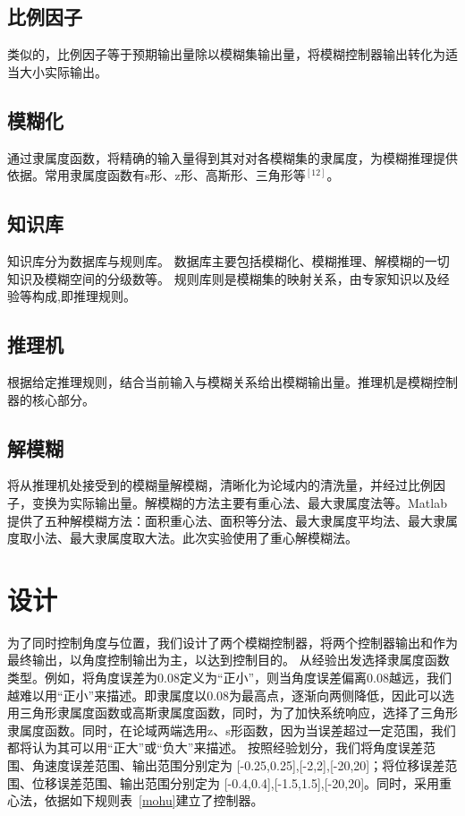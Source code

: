 \subsection{比例因子}
类似的，比例因子等于预期输出量除以模糊集输出量，将模糊控制器输出转化为适当大小实际输出。
\subsection{模糊化}
通过隶属度函数，将精确的输入量得到其对对各模糊集的隶属度，为模糊推理提供依据。常用隶属度函数有s形、z形、高斯形、三角形等$^{[12]}$。
\subsection{知识库}
知识库分为数据库与规则库。
数据库主要包括模糊化、模糊推理、解模糊的一切知识及模糊空间的分级数等。 
规则库则是模糊集的映射关系，由专家知识以及经验等构成,即推理规则。
\subsection{推理机}
根据给定推理规则，结合当前输入与模糊关系给出模糊输出量。推理机是模糊控制器的核心部分。
\subsection{解模糊}
将从推理机处接受到的模糊量解模糊，清晰化为论域内的清洗量，并经过比例因子，变换为实际输出量。解模糊的方法主要有重心法、最大隶属度法等。Matlab提供了五种解模糊方法：面积重心法、面积等分法、最大隶属度平均法、最大隶属度取小法、最大隶属度取大法。此次实验使用了重心解模糊法。

\section{设计}
为了同时控制角度与位置，我们设计了两个模糊控制器，将两个控制器输出和作为最终输出，以角度控制输出为主，以达到控制目的。
从经验出发选择隶属度函数类型。例如，将角度误差为0.08定义为“正小”，则当角度误差偏离0.08越远，我们越难以用“正小”来描述。即隶属度以0.08为最高点，逐渐向两侧降低，因此可以选用三角形隶属度函数或高斯隶属度函数，同时，为了加快系统响应，选择了三角形隶属度函数。同时，在论域两端选用z、s形函数，因为当误差超过一定范围，我们都将认为其可以用“正大”或“负大”来描述。
按照经验划分，我们将角度误差范围、角速度误差范围、输出范围分别定为
[-0.25,0.25],[-2,2],[-20,20]；将位移误差范围、位移误差范围、输出范围分别定为
[-0.4,0.4],[-1.5,1.5],[-20,20]。同时，采用重心法，依据如下规则表~\ref{mohu}建立了控制器。

